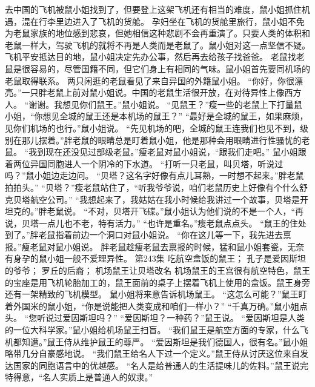 \documentclass[a4paper,12pt,UTF8,twoside]{ctexbook}
\begin{document}
        去中国的飞机被鼠小姐找到了，但要登上这架飞机还有相当的难度，鼠小姐抓住机遇，混在行李里边进入了飞机的货舱。  
        孕妇坐在飞机的货舱里旅行，鼠小姐不免为老鼠家族的地位感到悲哀，但她相信这种悲剧不会再重演了。只要人类的体积和老鼠一样大，驾驶飞机的就将不再是人类而是老鼠了。鼠小姐对这一点坚信不疑。  
        飞机平安抵达目的地，鼠小姐决定先办公事，然后再去给孩子找爸爸。  
        老鼠找老鼠是很容易的，尽管国籍不同，但它们身上有相同的气味。鼠小姐首先要同机场的老鼠取得联系。  
        两只闲逛的老鼠看见了来自异国的外籍鼠小姐。  
        “你好，你很漂亮。”一只胖老鼠上前对鼠小姐说。中国的老鼠生活很开放，在对待异性上像西方人。  
        “谢谢。我想见你们鼠王。”鼠小姐说。  
        “见鼠王？”瘦一些的老鼠上下打量鼠小姐，“你想见全城的鼠王还是本机场的鼠王？”  
        “最好是全城的鼠王，如果麻烦，见你们机场的也行。”鼠小姐说。  
        “先见机场的吧，全城的鼠王连我们也见不到，级别在那儿摆着。”胖老鼠的眼睛总是盯着鼠小姐，他是那种会用眼睛进行性骚忧的老鼠。  
        “我到现在还没见过部级老鼠。”瘦老鼠对鼠小姐说，“跟我们走吧。”  
        鼠小姐跟着两位异国同胞进人一个阴冷的下水道。  
        “打听一只老鼠，叫贝塔，听说过吗？”鼠小姐边走边问。  
        “贝塔？这名字好像有点儿耳熟，一时想不起来。”胖老鼠拍拍头。”  
        “贝塔？”瘦老鼠站住了，“听我爷爷说，咱们老鼠历史上好像有个什么舒克贝塔航空公司。”  
        “我想起来了，我姑姑在我小时候给我讲过一个故事，贝塔是开坦克的。”胖老鼠说。  
        “不对，贝塔开飞碟。”鼠小姐认为他们说的不是一个人，“再说，贝塔一点儿也不老，特有活力。”  
        “也许是重名。”瘦老鼠点点头。  
        “鼠王的住处到了。”胖老鼠指着前边一个洞口对鼠小姐说。  
        “你在这儿等一下，我先进去禀报。”瘦老鼠对鼠小姐说。  
        胖老鼠趁瘦老鼠去禀报的时候，猛和鼠小姐套瓷，无奈有身孕的鼠小姐一般不爱理异性。          第243集  
        吃航空盒饭的鼠王；  
        孔子是爱因斯坦的爷爷；  
        罗丘的后裔；  
        机场鼠王让贝塔改名    
        机场鼠王的王宫很有航空特色，鼠王的宝座是用飞机轮胎加工的，鼠王面前的桌子上摆着飞机上使用的盒饭。鼠王身旁还有一架精致的飞机模型。  
        鼠小姐将来意告诉机场鼠王。  
        “这怎么可能？”鼠王盯着外国米的鼠小姐，“你是说能把人类变成和咱们一样小？”  
        “千真万确。”鼠小姐点头。  
        “您听说过爱因斯坦吗？”  
        “爱因斯坦？一种药？”鼠王说。  
        “爱因斯坦是人类的一位大科学家。”鼠小姐给机场鼠王扫盲。        
        “我们鼠王是航空方面的专家，什么飞机都知遭。”鼠王侍从维护鼠王的尊严。  
        “爱因斯坦是我们德国人，很有名。”鼠小姐略带几分自豪感地说。  
        “我们鼠王给名人下过一个定义。”鼠王侍从讨厌这位来自发达国家的同胞语言中的优越感。  
        “名人是给普通人的生活提味儿的佐料。”鼠王说完特得意，“名人实质上是普通人的奴隶。”  
\end{document}

